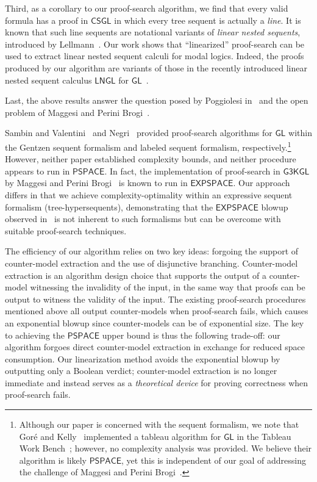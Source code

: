 \documentclass[copyright,creativecommons]{eptcs}
\newcommand{\logicgl}{\mathsf{GL}}
\newcommand{\calc}{\mathsf{CSGL}}
\newcommand{\pspace}{\mathsf{PSPACE}}
\newcommand{\expspace}{\mathsf{EXPSPACE}}
\begin{document}
\begin{description}[leftmargin=!, labelwidth=1em, labelsep=.5em]
\item[$\bullet$] Third, as a corollary to our proof-search algorithm, we find that every valid formula has a proof in $\calc$ in which every tree sequent is actually a \emph{line}. It is known that such line sequents are notational variants of \emph{linear nested sequents}, introduced by Lellmann~\cite{Lel15}. Our work shows that ``linearized'' proof-search can be used to extract linear nested sequent calculi for modal logics. Indeed, the proofs produced by our algorithm are variants of those in the recently introduced linear nested sequent calculus $\mathsf{LNGL}$ for $\logicgl$~\cite{Lyo25}.

\item[$\bullet$] Last, the above results answer the question posed by Poggiolesi in~\cite{Pog09b} and the open problem of Maggesi and Perini Brogi~\cite{MagPer23}.

\end{description}

Sambin and Valentini~\cite{SamVal80} and Negri~\cite{Neg14} provided proof-search algorithms for $\logicgl$ within the Gentzen sequent formalism and labeled sequent formalism, respectively.\footnote{Although our paper is concerned with the sequent formalism, we note that Gor\'{e} and Kelly~\cite{GorKel07} implemented a tableau algorithm for
$\logicgl$ in the Tableau Work Bench~\cite{AbaGor09}; however, no complexity analysis was provided. We believe their algorithm is likely $\pspace$, yet this is independent of our goal of addressing the challenge of Maggesi and Perini Brogi~\cite{MagPer23}.} However, neither paper established complexity bounds, and neither procedure appears to run in $\pspace$. In fact, the implementation of proof-search in $\mathsf{G3KGL}$ by Maggesi and Perini Brogi~\cite{MagPer23} is known to run in $\expspace$. Our approach differs in that we achieve complexity-optimality within an expressive sequent formalism (tree-hypersequents), demonstrating that the $\expspace$ blowup observed in~\cite{MagPer23} is not inherent to such formalisms but can be overcome with suitable proof-search techniques.

The efficiency of our algorithm relies on two key ideas: forgoing the support of counter-model extraction and the use of disjunctive branching. Counter-model extraction is an algorithm design choice that supports the output of a counter-model witnessing the invalidity of the input, in the same way that proofs can be output to witness the validity of the input. The existing proof-search procedures mentioned above all output counter-models when proof-search fails, which causes an exponential blowup since counter-models can be of exponential size. The key to achieving the $\pspace$ upper bound is thus the following trade-off: our algorithm forgoes direct counter-model extraction in exchange for reduced space consumption. Our linearization method avoids
the exponential blowup by outputting only a Boolean verdict;
counter-model extraction is no longer immediate and instead serves as a \emph{theoretical device} for proving correctness when proof-search fails.
\end{document}
